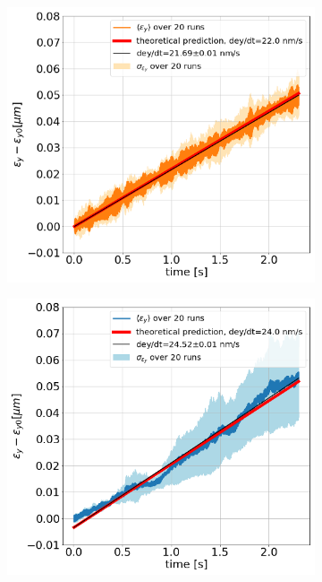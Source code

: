 \begin{figure}[htp]
    \centering
    \begin{subfigure}{.45\textwidth}
        \centering
        \includegraphics[width=.95\linewidth]{images/Ch6/study_3_AN_sixtracklib_global_CC_scheme.png}  
    \end{subfigure}
    \begin{subfigure}{.45\textwidth}
        \centering
        \includegraphics[width=.95\linewidth]{images/Ch6/study_3_PN_sixtracklib_global_CC_scheme.png}

\end{subfigure}
\end{figure}
